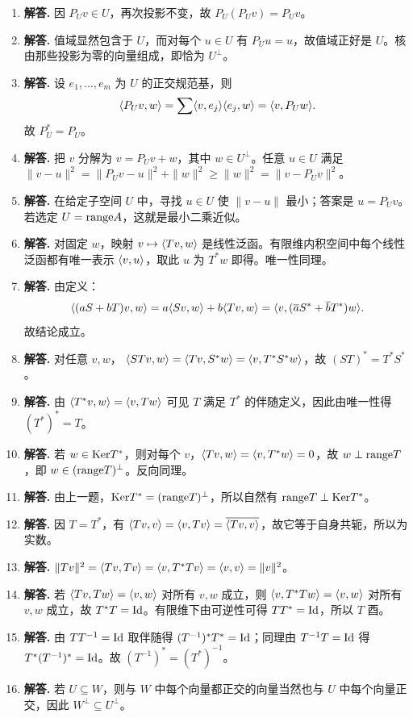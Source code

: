 \begin{enumerate}[label=\textbf{\arabic*.}, leftmargin=*, itemsep=1em]
\item \textbf{解答.} 因 $P_Uv\in U$，再次投影不变，故 $P_U(P_Uv)=P_Uv$。
\item \textbf{解答.} 值域显然包含于 $U$，而对每个 $u\in U$ 有 $P_Uu=u$，故值域正好是 $U$。核由那些投影为零的向量组成，即恰为 $U^{\perp}$。
\item \textbf{解答.} 设 $e_1,\dots,e_m$ 为 $U$ 的正交规范基，则
\[
\langle P_Uv, w \rangle=\sum \langle v, e_j \rangle\langle e_j, w \rangle=\langle v, P_Uw \rangle.
\]
故 $P_U^*=P_U$。
\item \textbf{解答.} 把 $v$ 分解为 $v=P_Uv+w$，其中 $w\in U^{\perp}$。任意 $u\in U$ 满足
$\|v-u\|^2=\|P_Uv-u\|^2+\|w\|^2\ge\|w\|^2=\|v-P_Uv\|^2$。
\item \textbf{解答.} 在给定子空间 $U$ 中，寻找 $u\in U$ 使 $\|v-u\|$ 最小；答案是 $u=P_Uv$。若选定 $U=\mathrm{range} A$，这就是最小二乘近似。
\item \textbf{解答.} 对固定 $w$，映射 $v\mapsto\langle Tv, w \rangle$ 是线性泛函。有限维内积空间中每个线性泛函都有唯一表示 $\langle v, u \rangle$，取此 $u$ 为 $T^*w$ 即得。唯一性同理。
\item \textbf{解答.} 由定义：
\[
\langle (aS+bT)v, w \rangle=a\langle Sv, w \rangle+b\langle Tv, w \rangle=\langle v, (\overline aS^*+\overline bT^*)w \rangle.
\]
故结论成立。
\item \textbf{解答.} 对任意 $v,w$，
$\langle STv, w \rangle=\langle Tv, S^*w \rangle=\langle v, T^*S^*w \rangle$，故 $(ST)^*=T^*S^*$。
\item \textbf{解答.} 由
$\langle T^*v, w \rangle=\langle v, Tw \rangle$
可见 $T$ 满足 $T^*$ 的伴随定义，因此由唯一性得 $(T^*)^*=T$。
\item \textbf{解答.} 若 $w\in\mathrm{Ker} T^*$，则对每个 $v$，$\langle Tv, w \rangle=\langle v, T^*w \rangle=0$，故 $w\perp\mathrm{range} T$，即 $w\in(\mathrm{range} T)^{\perp}$。反向同理。
\item \textbf{解答.} 由上一题，$\mathrm{Ker} T^*=(\mathrm{range} T)^{\perp}$，所以自然有 $\mathrm{range} T\perp\mathrm{Ker} T^*$。
\item \textbf{解答.} 因 $T=T^*$，有
$\langle Tv, v \rangle=\langle v, Tv \rangle=\overline{\langle Tv, v \rangle}$，故它等于自身共轭，所以为实数。
\item \textbf{解答.} 
$\|Tv\|^2=\langle Tv, Tv \rangle=\langle v, T^*Tv \rangle=\langle v, v \rangle=\|v\|^2$。
\item \textbf{解答.} 若 $\langle Tv, Tw \rangle=\langle v, w \rangle$ 对所有 $v,w$ 成立，则
$\langle v, T^*Tw \rangle=\langle v, w \rangle$ 对所有 $v,w$ 成立，故 $T^*T=\mathrm{Id}$。有限维下由可逆性可得 $TT^*=\mathrm{Id}$，所以 $T$ 酉。
\item \textbf{解答.} 由 $TT^{-1}=\mathrm{Id}$ 取伴随得 $(T^{-1})^*T^*=\mathrm{Id}$；同理由 $T^{-1}T=\mathrm{Id}$ 得 $T^*(T^{-1})^*=\mathrm{Id}$。故 $(T^{-1})^*=(T^*)^{-1}$。
\item \textbf{解答.} 若 $U\subseteq W$，则与 $W$ 中每个向量都正交的向量当然也与 $U$ 中每个向量正交，因此 $W^{\perp}\subseteq U^{\perp}$。

\end{enumerate}
